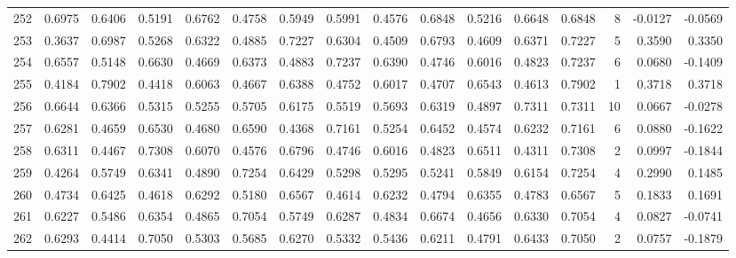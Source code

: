 \begin{tabular}{lrrrrrrrrrrrrrrr}
252 &      0.6975 &  0.6406 &  0.5191 &  0.6762 &  0.4758 &  0.5949 &  0.5991 &  0.4576 &  0.6848 &  0.5216 &   0.6648 &     0.6848 &      8 &                   -0.0127 &                    -0.0569 \\
253 &      0.3637 &  0.6987 &  0.5268 &  0.6322 &  0.4885 &  0.7227 &  0.6304 &  0.4509 &  0.6793 &  0.4609 &   0.6371 &     0.7227 &      5 &                    0.3590 &                     0.3350 \\
254 &      0.6557 &  0.5148 &  0.6630 &  0.4669 &  0.6373 &  0.4883 &  0.7237 &  0.6390 &  0.4746 &  0.6016 &   0.4823 &     0.7237 &      6 &                    0.0680 &                    -0.1409 \\
255 &      0.4184 &  0.7902 &  0.4418 &  0.6063 &  0.4667 &  0.6388 &  0.4752 &  0.6017 &  0.4707 &  0.6543 &   0.4613 &     0.7902 &      1 &                    0.3718 &                     0.3718 \\
256 &      0.6644 &  0.6366 &  0.5315 &  0.5255 &  0.5705 &  0.6175 &  0.5519 &  0.5693 &  0.6319 &  0.4897 &   0.7311 &     0.7311 &     10 &                    0.0667 &                    -0.0278 \\
257 &      0.6281 &  0.4659 &  0.6530 &  0.4680 &  0.6590 &  0.4368 &  0.7161 &  0.5254 &  0.6452 &  0.4574 &   0.6232 &     0.7161 &      6 &                    0.0880 &                    -0.1622 \\
258 &      0.6311 &  0.4467 &  0.7308 &  0.6070 &  0.4576 &  0.6796 &  0.4746 &  0.6016 &  0.4823 &  0.6511 &   0.4311 &     0.7308 &      2 &                    0.0997 &                    -0.1844 \\
259 &      0.4264 &  0.5749 &  0.6341 &  0.4890 &  0.7254 &  0.6429 &  0.5298 &  0.5295 &  0.5241 &  0.5849 &   0.6154 &     0.7254 &      4 &                    0.2990 &                     0.1485 \\
260 &      0.4734 &  0.6425 &  0.4618 &  0.6292 &  0.5180 &  0.6567 &  0.4614 &  0.6232 &  0.4794 &  0.6355 &   0.4783 &     0.6567 &      5 &                    0.1833 &                     0.1691 \\
261 &      0.6227 &  0.5486 &  0.6354 &  0.4865 &  0.7054 &  0.5749 &  0.6287 &  0.4834 &  0.6674 &  0.4656 &   0.6330 &     0.7054 &      4 &                    0.0827 &                    -0.0741 \\
262 &      0.6293 &  0.4414 &  0.7050 &  0.5303 &  0.5685 &  0.6270 &  0.5332 &  0.5436 &  0.6211 &  0.4791 &   0.6433 &     0.7050 &      2 &                    0.0757 &                    -0.1879 \\

\end{tabular}
